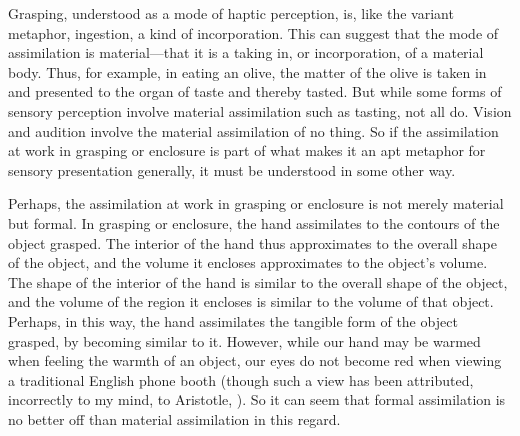 Grasping, understood as a mode of haptic perception, is, like the variant meta\-phor, ingestion, a kind of incorporation. This can suggest that the mode of assimilation is material---that it is a taking in, or incorporation, of a material body. Thus, for example, in eating an olive, the matter of the olive is taken in and presented to the organ of taste and thereby tasted. But while some forms of sensory perception involve material assimilation such as tasting, not all do. Vision and audition involve the material assimilation of no thing. So if the assimilation at work in grasping or enclosure is part of what makes it an apt metaphor for sensory presentation generally, it must be understood in some other way.

Perhaps, the assimilation at work in grasping or enclosure is not merely material but formal. In grasping or enclosure, the hand assimilates to the contours of the object grasped. The interior of the hand thus approximates to the overall shape of the object, and the volume it encloses approximates to the object's volume. The shape of the interior of the hand is similar to the overall shape of the object, and the volume of the region it encloses is similar to the volume of that object. Perhaps, in this way, the hand assimilates the tangible form of the object grasped, by becoming similar to it. However, while our hand may be warmed when feeling the warmth of an object, our eyes do not become red when viewing a traditional English phone booth (though such a view has been attributed, incorrectly to my mind, to Aristotle, \citealt{Slakey:1961ss, Sorabji:1974fk,Everson:1997ep}). So it can seem that formal assimilation is no better off than material assimilation in this regard.

